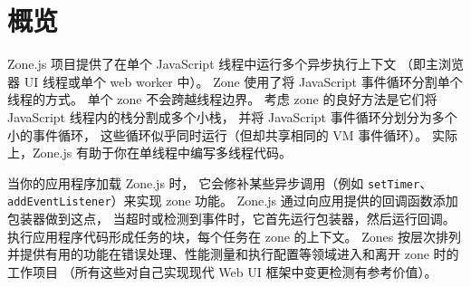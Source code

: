 \section{概览}


Zone.js 项目提供了在单个 JavaScript 线程中运行多个异步执行上下文
（即主浏览器 UI 线程或单个 web worker 中）。
Zone 使用了将 JavaScript 事件循环分割单个线程的方式。
单个 zone 不会跨越线程边界。
考虑 zone 的良好方法是它们将 JavaScript 线程内的栈分割成多个小栈，
并将 JavaScript 事件循环分划分为多个小的事件循环，
这些循环似乎同时运行（但却共享相同的 VM 事件循环）。
实际上，Zone.js 有助于你在单线程中编写多线程代码。


当你的应用程序加载 Zone.js 时，
它会修补某些异步调用（例如 \texttt{setTimer}、\texttt{addEventListener}）来实现 zone 功能。
Zone.js 通过向应用提供的回调函数添加包装器做到这点，
当超时或检测到事件时，它首先运行包装器，然后运行回调。
执行应用程序代码形成任务的块，每个任务在 zone 的上下文。
Zones 按层次排列并提供有用的功能在错误处理、性能测量和执行配置等领域进入和离开 zone 时的工作项目
（所有这些对自己实现现代 Web UI 框架中变更检测有参考价值）。

